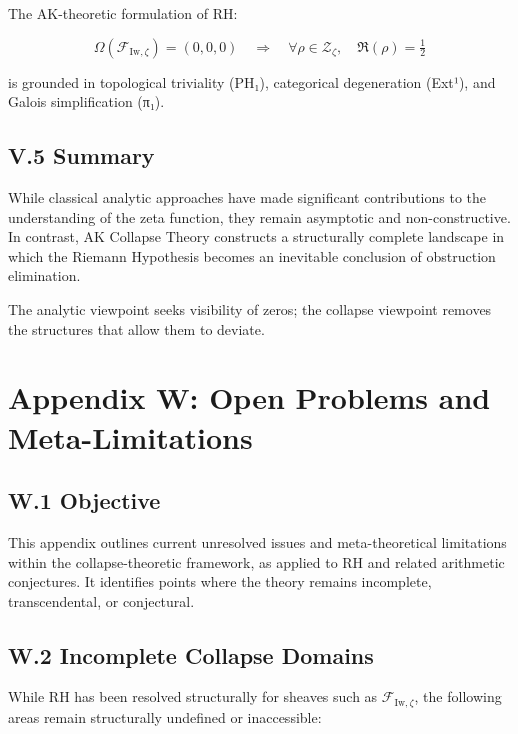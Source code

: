 \documentclass[11pt]{article}
\begin{document}
The AK-theoretic formulation of RH:

\[
\Omega(\mathcal{F}_{\mathrm{Iw},\zeta}) = (0,0,0) \quad \Longrightarrow \quad \forall \rho \in \mathcal{Z}_\zeta, \quad \Re(\rho) = \tfrac{1}{2}
\]

is grounded in topological triviality (PH₁), categorical degeneration (Ext¹), and Galois simplification (π₁).

\subsection*{V.5 Summary}

While classical analytic approaches have made significant contributions to the understanding of the zeta function, they remain asymptotic and non-constructive. In contrast, AK Collapse Theory constructs a structurally complete landscape in which the Riemann Hypothesis becomes an inevitable conclusion of obstruction elimination.

The analytic viewpoint seeks visibility of zeros; the collapse viewpoint removes the structures that allow them to deviate.



\appendix
\section*{Appendix W: Open Problems and Meta-Limitations}

\subsection*{W.1 Objective}

This appendix outlines current unresolved issues and meta-theoretical limitations within the collapse-theoretic framework, as applied to RH and related arithmetic conjectures. It identifies points where the theory remains incomplete, transcendental, or conjectural.

\subsection*{W.2 Incomplete Collapse Domains}

While RH has been resolved structurally for sheaves such as \( \mathcal{F}_{\mathrm{Iw},\zeta} \), the following areas remain structurally undefined or inaccessible:
\end{document}
